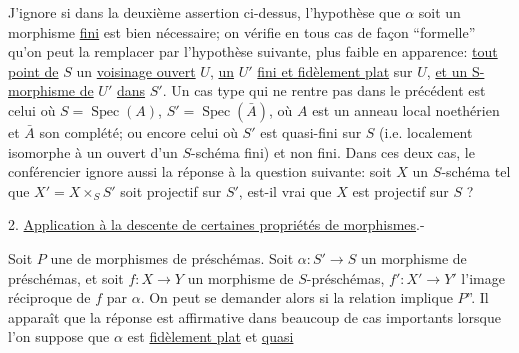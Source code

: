  J'ignore si dans la deuxième assertion ci-dessus, l'hypothèse que $\alpha$ soit un morphisme \uline{fini} est  bien nécessaire; on vérifie en tous cas de façon  ``formelle'' qu'on peut la remplacer par l'hypothèse suivante, plus faible en apparence:  \uline{tout point de} $S$   un \uline{voisinage ouvert} $U$, \uline{un} $U'$ \uline{fini et fidèlement plat} sur $U$, \uline{et un S-morphisme de} $U'$ \uline{dans} $S'$. Un cas type  qui ne rentre pas dans le précédent est celui où $S=\operatorname{Spec}(A)$,  $S'=\operatorname{Spec}(\bar A)$, où $A$ est un anneau local noethérien et $\bar A$ son complété; ou encore celui où $S'$ est quasi-fini sur $S$ (i.e. localement isomorphe à un ouvert d'un $S$-schéma fini) et non fini. Dans ces deux cas,  le conférencier ignore aussi la réponse à la question suivante: soit $X$ un $S$-schéma tel que $X'=X\times_S S'$  soit projectif sur $S'$, est-il vrai que $X$ est projectif sur $S$ ?

2. \uline{Application à la descente de certaines propriétés de morphismes}.- 

Soit $P$ une   de morphismes de préschémas. Soit $\alpha:S'\longrightarrow S$ un morphisme de préschémas,  et soit $f:X\longrightarrow Y$ un morphisme de $S$-préschémas, $f':X'\longrightarrow Y'$ l'image réciproque de $f$ par $\alpha$. On peut se demander alors si la relation   implique   $P$''.  Il apparaît que la réponse est affirmative dans beaucoup de cas importants lorsque l'on suppose que $\alpha$ est \uline{fidèlement plat} et \uline{quasi}

